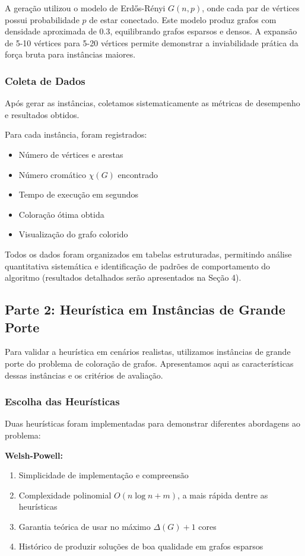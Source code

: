 \documentclass[12pt]{article}
\begin{document}
A geração utilizou o modelo de Erdős-Rényi $G(n, p)$, onde cada par de vértices possui probabilidade $p$ de estar conectado. Este modelo produz grafos com densidade aproximada de 0.3, equilibrando grafos esparsos e densos. A expansão de 5-10 vértices para 5-20 vértices permite demonstrar a inviabilidade prática da força bruta para instâncias maiores.

\subsubsection{Coleta de Dados}

Após gerar as instâncias, coletamos sistematicamente as métricas de desempenho e resultados obtidos.

Para cada instância, foram registrados:

\begin{itemize}
    \item Número de vértices e arestas
    \item Número cromático $\chi(G)$ encontrado
    \item Tempo de execução em segundos
    \item Coloração ótima obtida
    \item Visualização do grafo colorido
\end{itemize}

Todos os dados foram organizados em tabelas estruturadas, permitindo análise quantitativa sistemática e identificação de padrões de comportamento do algoritmo (resultados detalhados serão apresentados na Seção 4).

\subsection{Parte 2: Heurística em Instâncias de Grande Porte}

Para validar a heurística em cenários realistas, utilizamos instâncias de grande porte do problema de coloração de grafos. Apresentamos aqui as características dessas instâncias e os critérios de avaliação.

\subsubsection{Escolha das Heurísticas}

Duas heurísticas foram implementadas para demonstrar diferentes abordagens ao problema:

\textbf{Welsh-Powell:}
\begin{enumerate}
    \item Simplicidade de implementação e compreensão
    \item Complexidade polinomial $O(n \log n + m)$, a mais rápida dentre as heurísticas
    \item Garantia teórica de usar no máximo $\Delta(G) + 1$ cores
    \item Histórico de produzir soluções de boa qualidade em grafos esparsos
\end{enumerate}
\end{document}
